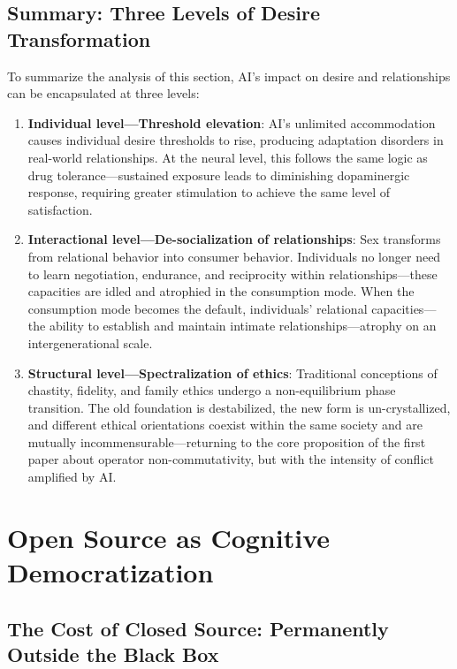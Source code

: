 ﻿\documentclass[12pt,a4paper]{article}
\begin{document}
\subsection{Summary: Three Levels of Desire Transformation}

To summarize the analysis of this section, AI's impact on desire and relationships can be encapsulated at three levels:

\begin{enumerate}[label=Level \arabic*:]

\item \textbf{Individual level---Threshold elevation}: AI's unlimited accommodation causes individual desire thresholds to rise, producing adaptation disorders in real-world relationships. At the neural level, this follows the same logic as drug tolerance---sustained exposure leads to diminishing dopaminergic response, requiring greater stimulation to achieve the same level of satisfaction.

\item \textbf{Interactional level---De-socialization of relationships}: Sex transforms from relational behavior into consumer behavior. Individuals no longer need to learn negotiation, endurance, and reciprocity within relationships---these capacities are idled and atrophied in the consumption mode. When the consumption mode becomes the default, individuals' relational capacities---the ability to establish and maintain intimate relationships---atrophy on an intergenerational scale.

\item \textbf{Structural level---Spectralization of ethics}: Traditional conceptions of chastity, fidelity, and family ethics undergo a non-equilibrium phase transition. The old foundation is destabilized, the new form is un-crystallized, and different ethical orientations coexist within the same society and are mutually incommensurable---returning to the core proposition of the first paper about operator non-commutativity, but with the intensity of conflict amplified by AI.

\end{enumerate}

\section{Open Source as Cognitive Democratization}

\subsection{The Cost of Closed Source: Permanently Outside the Black Box}
\end{document}
